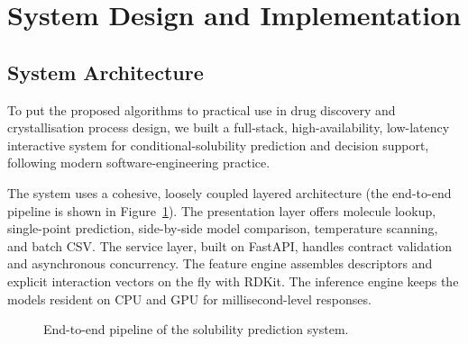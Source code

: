 \section{System Design and Implementation}\label{sec:v2-application}

\subsection{System Architecture}

To put the proposed algorithms to practical use in drug discovery and crystallisation process design, we built a full-stack, high-availability, low-latency interactive system for conditional-solubility prediction and decision support, following modern software-engineering practice.

The system uses a cohesive, loosely coupled layered architecture (the end-to-end pipeline is shown in Figure~\ref{fig:v2-app-flow}). The presentation layer offers molecule lookup, single-point prediction, side-by-side model comparison, temperature scanning, and batch CSV. The service layer, built on FastAPI, handles contract validation and asynchronous concurrency. The feature engine assembles descriptors and explicit interaction vectors on the fly with RDKit. The inference engine keeps the models resident on CPU and GPU for millisecond-level responses.

\begin{figure}[htbp]
\centering
{}
\caption{End-to-end pipeline of the solubility prediction system.}
\label{fig:v2-app-flow}
\end{figure}

